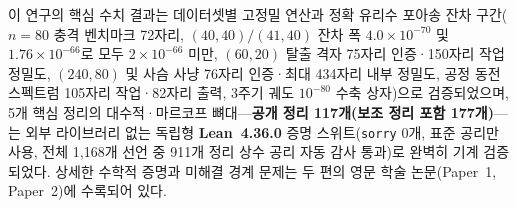 \documentclass[11pt,a4paper]{article}
\begin{document}
이 연구의 핵심 수치 결과는 데이터셋별 고정밀 연산과 정확 유리수 포아송 잔차 구간($n=80$ 충격 벤치마크 72자리, $(40,40)/(41,40)$ 잔차 폭 $4.0\times 10^{-70}$ 및 $1.76\times 10^{-66}$로 모두 $2\times 10^{-66}$ 미만, $(60,20)$ 탈출 격자 75자리 인증·150자리 작업 정밀도, $(240,80)$ 및 사슴 사냥 76자리 인증·최대 434자리 내부 정밀도, 공정 동전 스펙트럼 105자리 작업·82자리 출력, 3주기 궤도 $10^{-80}$ 수축 상자)으로 검증되었으며, 5개 핵심 정리의 대수적·마르코프 뼈대---\textbf{공개 정리 117개(보조 정리 포함 177개)}---는 외부 라이브러리 없는 독립형 \textbf{Lean~4.36.0} 증명 스위트(\texttt{sorry} 0개, 표준 공리만 사용, 전체 1,168개 선언 중 911개 정리 상수 공리 자동 감사 통과)로 완벽히 기계 검증되었다. 상세한 수학적 증명과 미해결 경계 문제는 두 편의 영문 학술 논문(Paper~1, Paper~2)에 수록되어 있다.
\end{document}
